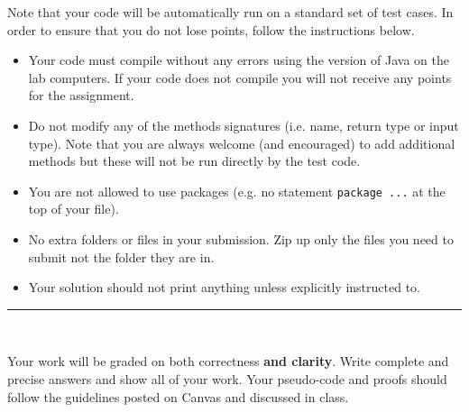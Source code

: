 \documentclass[11pt,answers]{exam}
\begin{document}
\noindent Note that your code will be automatically run on a standard set of test cases.  In order to ensure that you do not lose points, follow the instructions below.
\begin{itemize}
\item Your code must compile without any errors using the version of Java on the lab computers.  If your code does not compile you will not receive any points for the assignment.
\item Do not modify any of the methods signatures (i.e. name, return type or input type).  Note that you are always welcome (and encouraged) to add additional methods but these will not be run directly by the test code.
\item You are not allowed to use packages (e.g. no statement \texttt{package ...} at the top of your file).
\item No extra folders or files in your submission.  Zip up only the files you need to submit not the folder they are in.
\item Your solution should not print anything unless explicitly instructed to.
\end{itemize}

\hrule
\vspace{2em}
\\

\vspace{.5em}

\noindent Your work will be graded on both correctness {\bf and clarity}.  Write complete and precise answers and show all of your work.  Your pseudo-code and proofs should follow the guidelines posted on Canvas and discussed in class.\\

 \\
   
\end{document}
